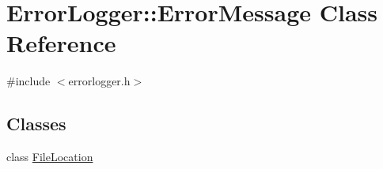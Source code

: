 \hypertarget{class_error_logger_1_1_error_message}{\section{Error\-Logger\-:\-:Error\-Message Class Reference}
\label{class_error_logger_1_1_error_message}
}


{\ttfamily \#include $<$errorlogger.\-h$>$}

\subsection*{Classes}
\begin{DoxyCompactItemize}
\item 
class \hyperlink{class_error_logger_1_1_error_message_1_1_file_location}{File\-Location}
\end{DoxyCompactItemize}
